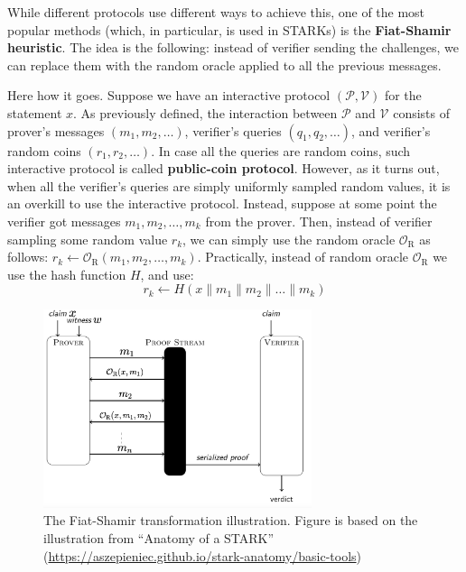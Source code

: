 \documentclass[../lecture-notes.tex]{subfiles}
\begin{document}
While different protocols use different ways to achieve this, one of the most popular methods (which, in particular, is used in STARKs) is the \textbf{Fiat-Shamir heuristic}. The idea is the following: instead of verifier sending the challenges, we can replace them with the random oracle applied to all the previous messages. 

Here how it goes. Suppose we have an interactive protocol $(\mathcal{P}, \mathcal{V})$ for the statement $x$. As previously defined, the interaction between $\mathcal{P}$ and $\mathcal{V}$ consists of prover's messages $(m_1,m_2,\dots)$, verifier's queries $(q_1,q_2,\dots)$, and verifier's random coins $(r_1,r_2,\dots)$. In case all the queries are random coins, such interactive protocol is called \textbf{public-coin protocol}. However, as it turns out, when all the verifier's queries are simply uniformly sampled random values, it is an overkill to use the interactive protocol. Instead, suppose at some point the verifier got messages $m_1,m_2,\dots,m_k$ from the prover. Then, instead of verifier sampling some random value $r_k$, we can simply use the random oracle $\mathcal{O}_{\text{R}}$ as follows: $r_k \gets \mathcal{O}_{\text{R}}(m_1,m_2,\dots,m_k)$. Practically, instead of random oracle $\mathcal{O}_{\text{R}}$ we use the hash function $H$, and use:
\begin{equation*}
    r_k \gets H(x \parallel m_1 \parallel m_2 \parallel \dots \parallel m_k)
\end{equation*} 

\begin{figure}[H]
    \centering
    \includegraphics[width=0.7\textwidth]{images/lecture_6/fiat-shamir.pdf}
    \caption{The Fiat-Shamir transformation illustration. Figure is based on the illustration from ``Anatomy of a STARK'' (\url{https://aszepieniec.github.io/stark-anatomy/basic-tools})}
    \label{fig:fiat-shamir}
\end{figure}
\end{document}
